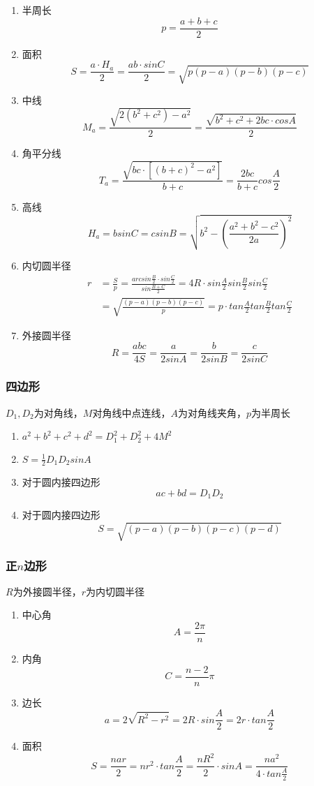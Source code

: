 \documentclass[a4paper]{ctexart}
\begin{document}
\begin{enumerate}
	\item 半周长
	$$p=\frac{a+b+c}{2}$$
	\item 面积
	$$S=\frac{a \cdot H_a}{2}=\frac{ab \cdot sinC}{2}=\sqrt{p(p-a)(p-b)(p-c)}$$
	\item 中线
	$$M_a=\frac{\sqrt{2(b^2+c^2)-a^2}}{2}=\frac{\sqrt{b^2+c^2+2bc \cdot cosA}}{2}$$
	\item 角平分线
	$$T_a=\frac{\sqrt{bc \cdot [(b+c)^2-a^2]}}{b+c}=\frac{2bc}{b+c}cos\frac{A}{2}$$
	\item 高线
	$$H_a=bsinC=csinB=\sqrt{b^2-(\frac{a^2+b^2-c^2}{2a})^2}$$
	\item 内切圆半径
	\begin{align*}
	r&=\frac{S}{p}=\frac{arcsin\frac{B}{2} \cdot sin\frac{C}{2}}{sin\frac{B+C}{2}}=4R \cdot sin\frac{A}{2}sin\frac{B}{2}sin\frac{C}{2}\\
	&=\sqrt{\frac{(p-a)(p-b)(p-c)}{p}}=p \cdot tan\frac{A}{2}tan\frac{B}{2}tan\frac{C}{2}
	\end{align*}
	\item 外接圆半径
	$$R=\frac{abc}{4S}=\frac{a}{2sinA}=\frac{b}{2sinB}=\frac{c}{2sinC}$$
\end{enumerate}

\subsubsection{四边形}

$D_1, D_2$为对角线，$M$对角线中点连线，$A$为对角线夹角，$p$为半周长
\begin{enumerate}
	\item $a^2+b^2+c^2+d^2=D_1^2+D_2^2+4M^2$
	\item $S=\frac{1}{2}D_1D_2sinA$
	\item 对于圆内接四边形
	$$ac+bd=D_1D_2$$
	\item 对于圆内接四边形
	$$S=\sqrt{(p-a)(p-b)(p-c)(p-d)}$$
\end{enumerate}

\subsubsection{正$n$边形}

$R$为外接圆半径，$r$为内切圆半径
\begin{enumerate}
	\item 中心角
	$$A=\frac{2\pi}{n}$$
	\item 内角
	$$C=\frac{n-2}{n}\pi$$
	\item 边长
	$$a=2\sqrt{R^2-r^2}=2R \cdot sin\frac{A}{2}=2r \cdot tan\frac{A}{2}$$
	\item 面积
	$$S=\frac{nar}{2}=nr^2 \cdot tan\frac{A}{2}=\frac{nR^2}{2} \cdot sinA=\frac{na^2}{4 \cdot tan\frac{A}{2}}$$
\end{enumerate}
\end{document}
